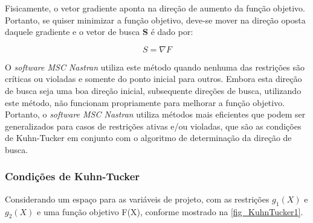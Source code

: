 Fisicamente, o vetor gradiente aponta na direção de aumento da função objetivo. Portanto, se quiser minimizar a função objetivo, deve-se mover na direção oposta daquele gradiente e o vetor de busca \textbf{S} é dado por:

\begin{equation} \label{otimization_7}
S = \nabla F
\end{equation}

O \emph{software MSC Nastran} utiliza este método quando nenhuma das restrições são críticas ou violadas e somente do ponto inicial para outros. Embora esta direção de busca seja uma boa direção inicial, subsequente direções de busca, utilizando este método, não funcionam propriamente para melhorar a função objetivo. Portanto, o \emph{software MSC Nastran} utiliza métodos mais eficientes que podem ser generalizados para casos de restrições ativas e/ou violadas, que são as condições de Kuhn-Tucker em conjunto com o algoritmo de determinação da direção de busca.

\subsubsection{Condições de Kuhn-Tucker}
Considerando um espaço para as variáveis de projeto, com as restrições $g_1(X)$ e $g_2(X)$ e uma função objetivo F(X), conforme mostrado na  \autoref{fig_KuhnTucker1}.
